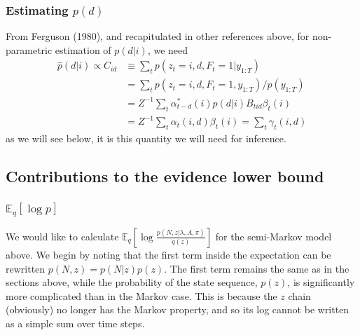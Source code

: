 \documentclass[11pt]{article}
\begin{document}
\subsubsection{Estimating $p(d)$}
From Ferguson (1980), and recapitulated in other references above, for non-parametric estimation of $p(d|i)$, we need
\begin{align}
    \hat{p}(d|i) \propto C_{id} &\equiv \sum_t p(z_t = i, d, F_t=1|y_{1:T}) \\
    &= \sum_t p(z_t = i, d, F_t=1, y_{1:T}) / p(y_{1:T}) \\
    &= Z^{-1}\sum_t \alpha^*_{t - d}(i) p(d|i) B_{tid} \beta_t(i) \\
    &= Z^{-1}\sum_t \alpha_t(i, d)\beta_t(i) = \sum_t \gamma_t(i, d)
\end{align}
as we will see below, it is this quantity we will need for inference.

\subsection{Contributions to the evidence lower bound}
\subsubsection{$\mathbb{E}_q[\log p]$}
We would like to calculate $\mathbb{E}_{q}\left[ \log \frac{p(N, z|\lambda, A, \pi)}{q(z)}\right]$ for the semi-Markov model above. We begin by noting that the first term inside the expectation can be rewritten $p(N, z) = p(N|z)p(z)$. The first term remains the same as in the sections above, while the probability of the state sequence, $p(z)$, is significantly more complicated than in the Markov case. This is because the $z$ chain (obviously) no longer has the Markov property, and so its log cannot be written as a simple sum over time steps.
\end{document}

